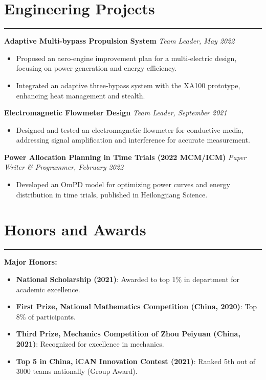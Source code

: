 \documentclass[11pt]{article}
\begin{document}
\vspace{6mm}

\section*{Engineering Projects}
\hrule

\noindent \textbf{Adaptive Multi-bypass Propulsion System} \hfill \textit{Team Leader, May 2022}
\begin{itemize}[leftmargin=*,itemsep=1pt]
    \item Proposed an aero-engine improvement plan for a multi-electric design, focusing on power generation and energy efficiency.
    \item Integrated an adaptive three-bypass system with the XA100 prototype, enhancing heat management and stealth.
\end{itemize}

\noindent \textbf{Electromagnetic Flowmeter Design} \hfill \textit{Team Leader, September 2021}
\begin{itemize}[leftmargin=*,itemsep=1pt]
    \item Designed and tested an electromagnetic flowmeter for conductive media, addressing signal amplification and interference for accurate measurement.
\end{itemize}

\noindent \textbf{Power Allocation Planning in Time Trials (2022 MCM/ICM)} \hfill \textit{Paper Writer \& Programmer, February 2022}
\begin{itemize}[leftmargin=*,itemsep=1pt]
    \item Developed an OmPD model for optimizing power curves and energy distribution in time trials, published in Heilongjiang Science.
\end{itemize}

\section*{Honors and Awards}
\hrule

\vspace{3mm}

\noindent\textbf{Major Honors:}
\begin{itemize}[leftmargin=*,itemsep=1pt]
    \item \textbf{National Scholarship (2021)}: Awarded to top 1\% in department for academic excellence.
    \item \textbf{First Prize, National Mathematics Competition (China, 2020)}: Top 8\% of participants.
    \item \textbf{Third Prize, Mechanics Competition of Zhou Peiyuan (China, 2021)}: Recognized for excellence in mechanics.
    \item \textbf{Top 5 in China, iCAN Innovation Contest (2021)}: Ranked 5th out of 3000 teams nationally (Group Award).
\end{itemize}
\end{document}
